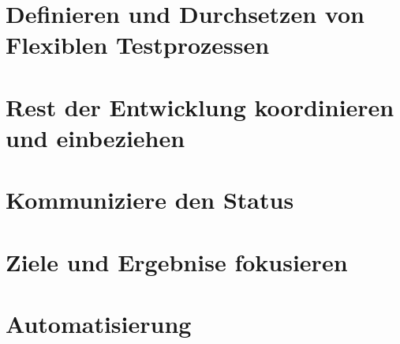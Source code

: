 \section{Definieren und Durchsetzen von Flexiblen Testprozessen}
\section{Rest der Entwicklung koordinieren und einbeziehen}
\section{Kommuniziere den Status}
\section{Ziele und Ergebnise fokusieren}
\section{Automatisierung}